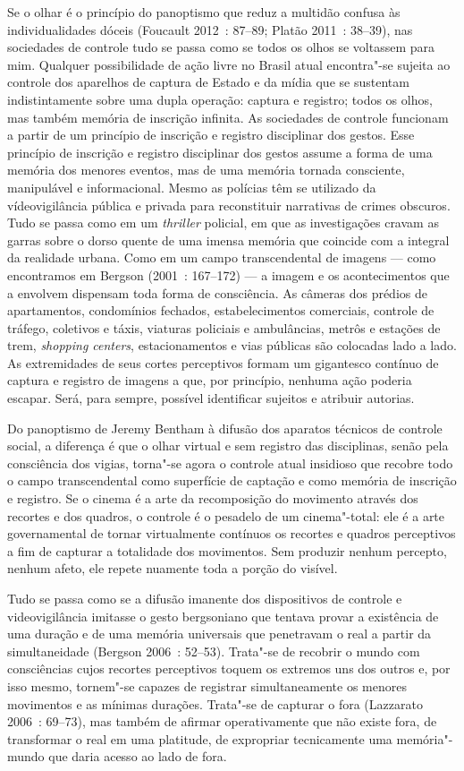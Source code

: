 Se o olhar é o princípio do panoptismo que reduz a multidão confusa às
individualidades dóceis (Foucault 2012~: 87--89; Platão 2011~: 38--39),
nas sociedades de controle tudo se passa como se todos os olhos se
voltassem para mim. Qualquer possibilidade de ação livre no Brasil atual
encontra"-se sujeita ao controle dos aparelhos de captura de Estado e da
mídia que se sustentam indistintamente sobre uma dupla operação: captura
e registro; todos os olhos, mas também memória de inscrição infinita. As
sociedades de controle funcionam a partir de um princípio de inscrição e
registro disciplinar dos gestos. Esse princípio de inscrição e registro
disciplinar dos gestos assume a forma de uma memória dos menores
eventos, mas de uma memória tornada consciente, manipulável e
informacional. Mesmo as polícias têm se utilizado da vídeovigilância
pública e privada para reconstituir narrativas de crimes obscuros. Tudo
se passa como em um \emph{thriller }policial, em que as investigações
cravam as garras sobre o dorso quente de uma imensa memória que coincide
com a integral da realidade urbana. Como em um campo transcendental de
imagens --- como encontramos em Bergson (2001~: 167--172) --- a imagem e os
acontecimentos que a envolvem dispensam toda forma de consciência. As
câmeras dos prédios de apartamentos, condomínios fechados,
estabelecimentos comerciais, controle de tráfego, coletivos e táxis,
viaturas policiais e ambulâncias, metrôs e estações de trem,
\emph{shopping centers}, estacionamentos e vias públicas são colocadas
lado a lado. As extremidades de seus cortes perceptivos formam um
gigantesco contínuo de captura e registro de imagens a que, por
princípio, nenhuma ação poderia escapar. Será, para sempre, possível
identificar sujeitos e atribuir autorias.

Do panoptismo de Jeremy Bentham à difusão dos aparatos técnicos de
controle social, a diferença é que o olhar virtual e sem registro das
disciplinas, senão pela consciência dos vigias, torna"-se agora o
controle atual insidioso que recobre todo o campo transcendental como
superfície de captação e como memória de inscrição e registro. Se o
cinema é a arte da recomposição do movimento através dos recortes e dos
quadros, o controle é o pesadelo de um cinema"-total: ele é a arte
governamental de tornar virtualmente contínuos os recortes e quadros
perceptivos a fim de capturar a totalidade dos movimentos. Sem produzir
nenhum percepto, nenhum afeto, ele repete nuamente toda a porção do
visível.

Tudo se passa como se a difusão imanente dos dispositivos de controle e
videovigilância imitasse o gesto bergsoniano que tentava provar a
existência de uma duração e de uma memória universais que penetravam o
real a partir da simultaneidade (Bergson 2006~: 52--53). Trata"-se de
recobrir o mundo com consciências cujos recortes perceptivos toquem os
extremos uns dos outros e, por isso mesmo, tornem"-se capazes de
registrar simultaneamente os menores movimentos e as mínimas durações.
Trata"-se de capturar o fora (Lazzarato 2006~: 69--73), mas também de
afirmar operativamente que não existe fora, de transformar o real em uma
platitude, de expropriar tecnicamente uma memória"-mundo que daria acesso
ao lado de fora.

